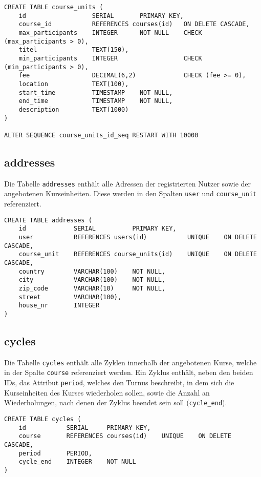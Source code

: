 \begin{verbatim}
CREATE TABLE course_units (
    id                  SERIAL       PRIMARY KEY,
    course_id           REFERENCES courses(id)   ON DELETE CASCADE,
    max_participants    INTEGER      NOT NULL    CHECK (max_participants > 0),
    titel               TEXT(150),
    min_participants    INTEGER                  CHECK (min_participants > 0),
    fee                 DECIMAL(6,2)             CHECK (fee >= 0),
    location            TEXT(100),
    start_time          TIMESTAMP    NOT NULL,
    end_time            TIMESTAMP    NOT NULL,
    description         TEXT(1000)
)

ALTER SEQUENCE course_units_id_seq RESTART WITH 10000
\end{verbatim}

\subsection{addresses}
Die Tabelle \texttt{addresses} enthält alle Adressen der registrierten Nutzer sowie der angebotenen Kurseinheiten. Diese werden in den Spalten \texttt{user} und \texttt{course\_unit} referenziert.

\begin{verbatim}
CREATE TABLE addresses (
    id             SERIAL          PRIMARY KEY,
    user           REFERENCES users(id)           UNIQUE    ON DELETE CASCADE,
    course_unit    REFERENCES course_units(id)    UNIQUE    ON DELETE CASCADE,
    country        VARCHAR(100)    NOT NULL,
    city           VARCHAR(100)    NOT NULL,
    zip_code       VARCHAR(10)     NOT NULL,
    street         VARCHAR(100),
    house_nr       INTEGER
)
\end{verbatim}

\subsection{cycles}
Die Tabelle \texttt{cycles} enthält alle Zyklen innerhalb der angebotenen Kurse, welche in der Spalte \texttt{course} referenziert werden. Ein Zyklus enthält, neben den beiden IDs, das Attribut \texttt{period}, welches den Turnus beschreibt, in dem sich die Kurseinheiten des Kurses wiederholen sollen, sowie die Anzahl an Wiederholungen, nach denen der Zyklus beendet sein soll (\texttt{cycle\_end}).

\begin{verbatim}
CREATE TABLE cycles (
    id           SERIAL     PRIMARY KEY,
    course       REFERENCES courses(id)    UNIQUE    ON DELETE CASCADE,
    period       PERIOD,
    cycle_end    INTEGER    NOT NULL
)
\end{verbatim}

